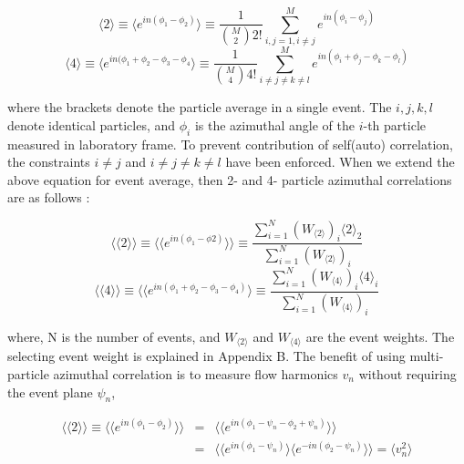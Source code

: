 \begin{equation}
	\langle 2 \rangle \equiv  \langle e^{in(\phi_1 - \phi_2)} \rangle \equiv \frac{1}{{M \choose 2}2!}\sum_{i,j=1, i\neq j}^{M}{e^{in(\phi_i - \phi_j)}}
\end{equation}
\begin{equation}
	\langle 4 \rangle \equiv \langle e^{in(\phi_1 + \phi_2 - \phi_3 - \phi_4} \rangle \equiv \frac{1}{{M \choose 4}4!}\sum^{M}_{i\neq j\neq k \neq l}e^{in(\phi_i + \phi_j - \phi_k - \phi_l)}
\end{equation}
\smallskip

where the brackets denote the particle average in a single event. The $i, j, k, l$ denote identical particles, and $\phi_i$ is the azimuthal angle of the $i$-th particle measured in laboratory frame. To prevent contribution of self(auto) correlation, the constraints $i \neq j$ and $i \neq j \neq k \neq l$ have been enforced. When we extend the above equation for event average, then 2- and 4- particle azimuthal correlations are as follows :

\begin{equation}
	\langle \langle 2 \rangle \rangle \equiv \langle \langle e^{in(\phi_1 - \phi2)} \rangle \rangle \equiv \frac{\sum_{i=1}^{N}{(W_{\langle 2 \rangle})_i}\langle 2 \rangle_2 }{\sum_{i=1}^{N}{(W_{\langle 2 \rangle})_i}}
\end{equation}
\begin{equation}
	\langle \langle 4 \rangle \rangle \equiv \langle \langle e^{in(\phi_1 + \phi_2 - \phi_3 - \phi_4)} \rangle \equiv \frac{\sum_{i=1}^{N}{(W_{\langle 4 \rangle })_i}\langle 4 \rangle_i }{\sum_{i=1}^{N}{(W_{\langle 4 \rangle})_i}}
\end{equation}
\smallskip

where, N is the number of events, and $W_{\langle 2 \rangle}$ and $W_{\langle 4 \rangle}$ are the event weights. The selecting event weight is explained in Appendix B. The benefit of using multi-particle azimuthal correlation is to measure flow harmonics $v_n$ without requiring the event plane $\psi_n$, 

\begin{eqnarray}
	\langle \langle 2 \rangle \rangle \equiv \langle \langle e^{in(\phi_1 - \phi_2)} \rangle  \rangle &=& \langle \langle e^{in(\phi_1 - \psi_n - \phi_2 + \psi_n)} \rangle \rangle  \\
		&=& \langle \langle e^{in(\phi_1 - \psi_n)} \rangle \langle e^{-in(\phi_2-\psi_n)} \rangle \rangle = \langle v_n^2 \rangle
		\label{eq:vn2}
\end{eqnarray}

